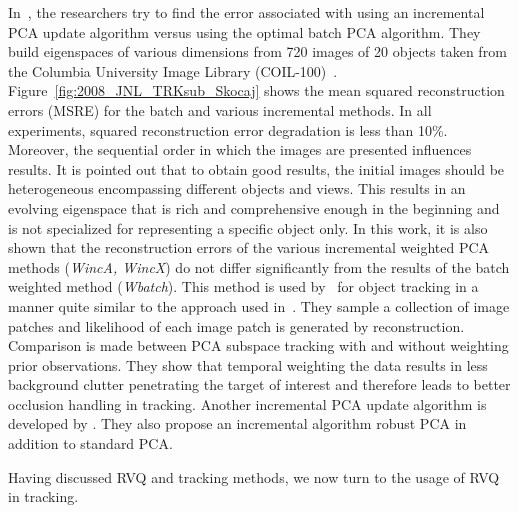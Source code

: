 In~\cite{2008_JNL_TRKsubs_Skocaj}, the researchers try to find the error associated with using an incremental PCA update algorithm versus using the optimal batch PCA algorithm.  They build eigenspaces of various dimensions from 720 images of 20 objects taken from the Columbia University Image Library (COIL-100)~\cite{Web_COIL}.  Figure~\ref{fig:2008_JNL_TRKsub_Skocaj} shows the mean squared reconstruction errors (MSRE) for the batch and various incremental methods.  In all experiments, squared reconstruction error degradation is less than 10\%.  Moreover, the sequential order in which the images are presented influences results.  It is pointed out that to obtain good results, the initial images should be heterogeneous encompassing different objects and views.  This results in an evolving eigenspace that is rich and comprehensive enough in the beginning and is not specialized for representing a specific object only.  In this work, it is also shown that the reconstruction errors of the various incremental weighted PCA methods (\emph{WincA, WincX}) do not differ significantly from the results of the batch weighted method (\emph{Wbatch}).  This method is used by~\cite{2010_CNF_TRKsubs_Qian} for object tracking in a manner quite similar to the approach used in~\cite{2008_JNL_subspaceTRK_Ross}.  They sample a collection of image patches and likelihood of each image patch is generated by reconstruction.  Comparison is made between PCA subspace tracking with and without weighting prior observations.  They show that temporal weighting the data results in less background clutter penetrating the target of interest and therefore leads to better occlusion handling in tracking.  Another incremental PCA update algorithm is developed by \cite{2004_JNL_TRKsubs_Li}.  They also propose an incremental algorithm robust PCA in addition to standard PCA.

Having discussed RVQ and tracking methods, we now turn to the usage of RVQ in tracking.



%
